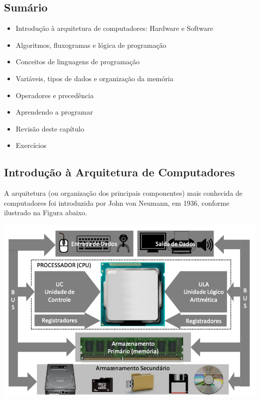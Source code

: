 \documentclass[12pt,a4paper]{article}
\providecommand{\tightlist}{%
      \setlength{\itemsep}{0pt}\setlength{\parskip}{0pt}}
\begin{document}
    \hypertarget{sumuxe1rio}{%
\subsection{Sumário}\label{sumuxe1rio}}

\begin{itemize}
\tightlist
\item
  Introdução à arquitetura de computadores: Hardware e Software
\item
  Algoritmos, fluxogramas e lógica de programação
\item
  Conceitos de linguagens de programação
\item
  Variáveis, tipos de dados e organização da memória
\item
  Operadores e precedência
\item
  Aprendendo a programar
\item
  Revisão deste capítulo
\item
  Exercícios
\end{itemize}

    \hypertarget{introduuxe7uxe3o-uxe0-arquitetura-de-computadores}{%
\subsection{Introdução à Arquitetura de
Computadores}\label{introduuxe7uxe3o-uxe0-arquitetura-de-computadores}}

    A arquitetura (ou organização dos principais componentes) mais conhecida
de computadores foi introduzida por John von Neumann, em 1936, conforme
ilustrado na Figura abaixo.

\includegraphics{"figs/image02.png"}
\end{document}

